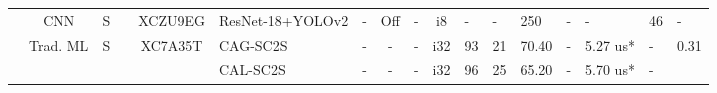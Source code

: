 \documentclass{article}
\begin{document}
\begin{table}
\begin{adjustbox}{totalheight=\baselineskip,}
\begin{tabular}{ccccclp{2em}cp{3em}cp{2em}p{4em}p{3em}p{3.5em}p{3.5em}p{2.5em}p{3em}}
   &\multirow{1}{*}{CNN}
       &\multirow{1}{*}{S}
           &\multirow{1}{*}{\cite{gargAircraftDetectionSatellite2024}}
               &\multirow{1}{*}{XCZU9EG}
                   &\multirow{1}{*}{ResNet-18+YOLOv2}
                       &\multirow{1}{*}{-}
                           &\multirow{1}{*}{Off}
                               &\multirow{1}{*}{-}
                                   &\multirow{1}{*}{i8}
                                       &\multirow{1}{*}{-}
                                           &\multirow{1}{*}{-}
                                               &\multirow{1}{*}{250}
                                                   &\multirow{1}{*}{-}
                                                       &\multirow{1}{*}{-}
                                                           &\multirow{1}{*}{46}
                                                               &\multirow{1}{*}{-}\\
\cmidrule{2-17}
   &\multirow{3}{*}{Trad. ML}
       &\multirow{3}{*}{S}
           &\multirow{3}{*}{\cite{gyaneshwarRealtimeSCSUP2022}}
               &\multirow{3}{*}{XC7A35T}
                   &\multirow{1}{*}{CAG-SC2S}
                       &\multirow{1}{*}{-}
                           &\multirow{1}{*}{-}
                               &\multirow{1}{*}{-}
                                   &\multirow{1}{*}{i32}
                                       &\multirow{1}{*}{93}
                                           &\multirow{1}{*}{21}
                                               &\multirow{1}{*}{70.40}
                                                   &\multirow{1}{*}{-}
                                                       &\multirow{1}{*}{5.27 us*}
                                                           &\multirow{1}{*}{-}
                                                               &\multirow{1}{*}{0.31}\\
   &   &   &   &   &\multirow{1}{*}{CAL-SC2S}
                       &\multirow{1}{*}{-}
                           &\multirow{1}{*}{-}
                               &\multirow{1}{*}{-}
                                   &\multirow{1}{*}{i32}
                                       &\multirow{1}{*}{96}
                                           &\multirow{1}{*}{25}
                                               &\multirow{1}{*}{65.20}
                                                   &\multirow{1}{*}{-}
                                                       &\multirow{1}{*}{5.70 us*}
                                                           &\multirow{1}{*}{-}

\end{tabular}
\end{adjustbox}
\end{table}
\end{document}

